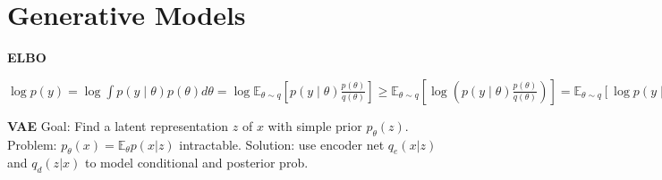 \section{Generative Models}

\textbf{ELBO} \begin{scriptsize}
    $\log p(y) = \log \int p(y \mid \theta) p(\theta) d \theta = \log \mathbb{E}_{\theta \sim q}\left[p(y \mid \theta) \frac{p(\theta)}{q(\theta)}\right] \geq \mathbb{E}_{\theta \sim q}\left[\log \left(p(y \mid \theta) \frac{p(\theta)}{q(\theta)}\right)\right]  = \mathbb{E}_{\theta \sim q}[\log p(y \mid \theta)]-K L(q \| p(\cdot))$
\end{scriptsize}

\textbf{VAE} Goal: Find a latent representation $z$ of $x$ with simple prior $p_\theta(z)$. Problem: $p_\theta(x) = \mathbb{E}_{\theta}p(x|z)$ intractable. Solution: use encoder net $q_e(x|z)$ and $q_d(z|x)$ to model conditional and posterior prob.

